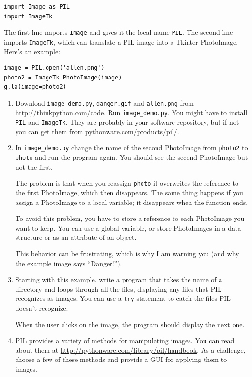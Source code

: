 \documentclass[10pt]{book}
\begin{document}
\begin{CJK}{UTF8}{gbsn}
\begin{exercise}
\begin{verbatim}
import Image as PIL
import ImageTk
\end{verbatim}
%
The first line imports {\tt Image} and
gives it the local name {\tt PIL}.  The second
line imports {\tt ImageTk}, which can translate a PIL
image into a Tkinter PhotoImage.  Here's an example:

\begin{verbatim}
image = PIL.open('allen.png')
photo2 = ImageTk.PhotoImage(image)
g.la(image=photo2)
\end{verbatim}
%

\begin{enumerate}

\item Download \verb"image_demo.py", \verb"danger.gif" and \verb"allen.png"
from \url{http://thinkpython.com/code}.  Run \verb"image_demo.py".  You
might have to install {\tt PIL} and {\tt ImageTk}.  
They are probably in your software repository,  but if not
you can get them from \url{pythonware.com/products/pil/}.

\item In \verb"image_demo.py" change the name of the second
PhotoImage from {\tt photo2} to {\tt photo} and run the program
again.  You should see the second PhotoImage but not the first.

The problem is that when you reassign {\tt photo} it overwrites
the reference to the first PhotoImage, which then disappears.  The
same thing happens if you assign a PhotoImage to a local
variable; it disappears when the function ends.

To avoid this problem, you have to store a reference to each
PhotoImage you want to keep.  You can use a global variable, or
store PhotoImages in a data structure or as an attribute of
an object.

This behavior can be frustrating, which is why I am warning
you (and why the example image says ``Danger!'').

\item Starting with this example, write a program that takes
the name of a directory and loops through all the files, displaying
any files that PIL recognizes as images.  You can use a {\tt try}
statement to catch the files PIL doesn't recognize.

When the user clicks on the image, the program should display the next one.

\item PIL provides a variety of methods for manipulating images.
You can read about them at \url{http://pythonware.com/library/pil/handbook}.
As a challenge, choose a few of these methods and provide a
GUI for applying them to images.


\end{enumerate}
\end{exercise}
\end{CJK}
\end{document}
